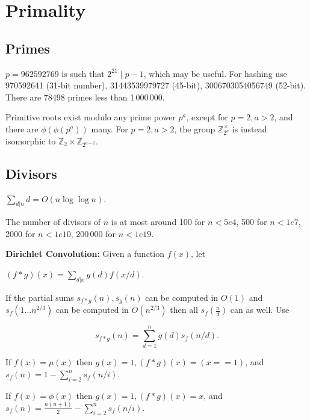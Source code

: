 \section{Primality}
	\subsection{Primes}
	$p=962592769$ is such that $2^{21} \mid p-1$, which may be useful. For hashing
	use 970592641 (31-bit number), 31443539979727 (45-bit), 3006703054056749
	(52-bit). There are 78498 primes less than 1\,000\,000.

	Primitive roots exist modulo any prime power $p^a$, except for $p = 2, a > 2$, and there are $\phi(\phi(p^a))$ many.
	For $p = 2, a > 2$, the group $\mathbb Z_{2^a}^\times$ is instead isomorphic to $\mathbb Z_2 \times \mathbb Z_{2^{a-2}}$.

	\subsection{Divisors}
	$\sum_{d|n} d = O(n \log \log n)$.

	The number of divisors of $n$ is at most around 100 for $n < 5e4$, 500 for $n < 1e7$, 2000 for $n < 1e10$, 200\,000 for $n < 1e19$.

	\textbf{Dirichlet Convolution:} Given a function $f(x)$, let 

	$(f*g)(x)=\sum_{d|x}g(d)f(x/d)$. 

	If the partial sums $s_{f*g}(n),s_g(n)$ can be computed in $O(1)$ and $s_f(1\ldots n^{2/3})$ can be computed in $O\left(n^{2/3}\right)$ then all $s_f\left(\frac{n}{d}\right)$ can as well. Use

	$$s_{f*g}(n)=\sum_{d=1}^ng(d)s_f(n/d).$$ 

	
    If $f(x)=\mu(x)$ then $g(x)=1, (f*g)(x)=(x == 1)$, and $s_f(n)=1-\sum_{i=2}^ns_f(n/i)$.

    If $f(x)=\phi(x)$ then $g(x)=1, (f*g)(x)=x$, and $s_f(n)=\frac{n(n+1)}{2}-\sum_{i=2}^ns_f(n/i).$


	\begin{comment}
	Let $s(x)=\sum_{i=1}^x\phi(i).$ Then 
	$$s(n)=\frac{n(n+1)}{2}-\sum_{i=2}^ns\left(\left\lfloor\frac{n}{i}\right\rfloor\right)$$
	can be computed in faster than $\Theta(n)$.
	\end{comment}
	
